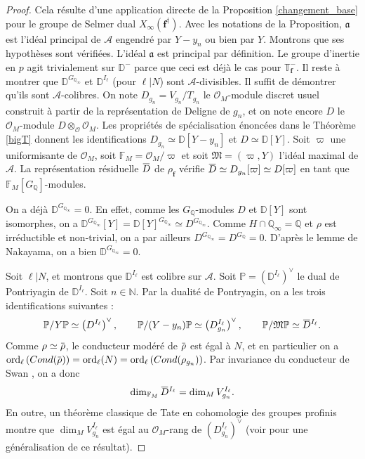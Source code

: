 \documentclass[12pt]{amsart}
\newcommand\bD{\mathbb{D}}
\newcommand\bN{\mathbb{N}}
\newcommand\bQ{\mathbb{Q}}
\newcommand\bF{\mathbb{F}}
\newcommand\bP{\mathbb{P}}
\newcommand\bT{\mathbb{T}}
\newcommand\cA{\mathcal{A}}
\newcommand\cO{\mathcal{O}}
\newcommand\ga{\mathfrak{a}}
\newcommand\gM{\mathfrak{M}}
\newcommand{\ob}[1]{\mkern 1.5mu\overline{\mkern-1.5mu#1\mkern-1.5mu}\mkern 1.5mu}
\newcommand{\ord}{\mathrm{ord}}
\theoremstyle{defstyle}
\theoremstyle{thmstyle}
\begin{document}
\begin{proof}
	Cela résulte d'une application directe de la Proposition \ref{changement_base} pour le groupe de Selmer dual $X_\infty(\textbf{f}^\dag)$. Avec les notations de la Proposition, $\ga$ est l'idéal principal de $\cA$ engendré par $Y-y_n$ ou bien par $Y$. Montrons que ses hypothèses sont vérifiées. L'idéal $\ga$ est principal par définition. Le groupe d'inertie en $p$ agit trivialement sur $\bD^-$ parce que ceci est déjà le cas pour $\bT_\textbf{f}^-$. Il reste à montrer que $\bD^{G_{\bQ_\infty}}$ et $\bD^{I_\ell}$ (pour $\ell|N$) sont $\cA$-divisibles. Il suffit de démontrer qu'ils sont $\cA$-colibres. On note $D_{g_n}=V_{g_n}/T_{g_n}$ le $\cO_M$-module discret usuel construit à partir de la représentation de Deligne de $g_n$, et on note encore $D$ le $\cO_M$-module $D \otimes_{\cO} \cO_M$. Les propriétés de spécialisation énoncées dans le Théorème \ref{bigT} donnent les identifications $D_{g_n}\simeq \bD[Y-y_n]$ et $D \simeq \bD[Y]$. Soit $\varpi$ une uniformisante de $\cO_M$, soit $\bF_M=\cO_M/\varpi$ et soit $\gM=(\varpi,Y)$ l'idéal maximal de $\cA$. La représentation résiduelle $\ob{D}$ de $\rho_\textbf{f}$ vérifie $\ob{D} \simeq D_{g_n}[\varpi] \simeq D[\varpi]$ en tant que $\bF_M[G_\bQ]$-modules.
	
	On a déjà $\bD^{G_{\bQ_\infty}}=0$. En effet, comme les $G_{\bQ}$-modules $D$ et $\bD[Y]$ sont isomorphes, on a $\bD^{G_{\bQ_\infty}}[Y]= \bD[Y]^{G_{\bQ_\infty}}\simeq D^{G_{\bQ_\infty}}$. Comme $H\cap \bQ_\infty=\bQ$ et $\rho$ est irréductible et non-trivial, on a par ailleurs $D^{G_{\bQ_\infty}}=D^{G_{\bQ}}=0$. D'après le lemme de Nakayama, on a bien $\bD^{G_{\bQ_\infty}}=0$.
	
	Soit $\ell|N$, et montrons que $\bD^{I_\ell}$ est colibre sur $\cA$. Soit $\bP=\left(\bD^{I_\ell}\right)^\vee$ le dual de Pontriyagin de $\bD^{I_\ell}$. Soit $n\in\bN$. Par la dualité de Pontryagin, on a les trois identifications suivantes :
	$$\bP/Y\bP \simeq \left(D^{I_\ell} \right)^\vee,\qquad \bP/(Y-y_n)\bP \simeq \left(D_{g_n}^{I_\ell} \right)^\vee,\qquad \bP/\gM \bP\simeq \ob{D}^{I_\ell}.$$
	Comme $\rho\simeq \ob{\rho}$, le conducteur modéré de $\ob{\rho}$ est égal à $N$, et en particulier on a $\ord_\ell\left(\textrm{Cond}(\ob{\rho})\right)=\ord_\ell(N)=\ord_\ell\left(\textrm{Cond}(\rho_{g_n})\right)$. Par invariance du conducteur de Swan \cite[Proposition 1.1]{livne}, on a donc 
	$$\dim_{\bF_M} \ob{D}^{I_\ell} = \dim_M V^{I_\ell}_{g_n}.$$
	En outre, un théorème classique de Tate en cohomologie des groupes profinis \cite[Proposition 2.3]{tate1976relation} montre que $\dim_M V^{I_\ell}_{g_n}$ est égal au $\cO_M$-rang de $\left(D_{g_n}^{I_\ell} \right)^\vee$ (voir \cite[Proposition 3.10]{greenberg2006structure} pour une généralisation de ce résultat). %
	

\end{proof}
\end{document}
